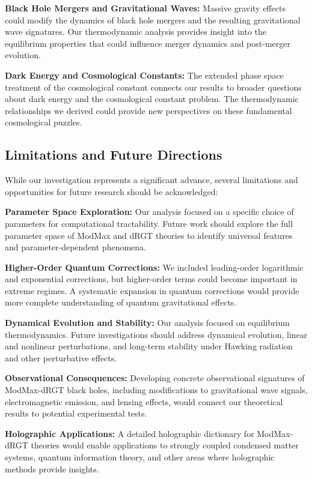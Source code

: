 \documentclass[12pt]{article}
\begin{document}
\textbf{Black Hole Mergers and Gravitational Waves:} Massive gravity effects could modify the dynamics of black hole mergers and the resulting gravitational wave signatures. Our thermodynamic analysis provides insight into the equilibrium properties that could influence merger dynamics and post-merger evolution.

\textbf{Dark Energy and Cosmological Constants:} The extended phase space treatment of the cosmological constant connects our results to broader questions about dark energy and the cosmological constant problem. The thermodynamic relationships we derived could provide new perspectives on these fundamental cosmological puzzles.

\subsection{Limitations and Future Directions}

While our investigation represents a significant advance, several limitations and opportunities for future research should be acknowledged:

\textbf{Parameter Space Exploration:} Our analysis focused on a specific choice of parameters for computational tractability. Future work should explore the full parameter space of ModMax and dRGT theories to identify universal features and parameter-dependent phenomena.

\textbf{Higher-Order Quantum Corrections:} We included leading-order logarithmic and exponential corrections, but higher-order terms could become important in extreme regimes. A systematic expansion in quantum corrections would provide more complete understanding of quantum gravitational effects.

\textbf{Dynamical Evolution and Stability:} Our analysis focused on equilibrium thermodynamics. Future investigations should address dynamical evolution, linear and nonlinear perturbations, and long-term stability under Hawking radiation and other perturbative effects.

\textbf{Observational Consequences:} Developing concrete observational signatures of ModMax-dRGT black holes, including modifications to gravitational wave signals, electromagnetic emission, and lensing effects, would connect our theoretical results to potential experimental tests.

\textbf{Holographic Applications:} A detailed holographic dictionary for ModMax-dRGT theories would enable applications to strongly coupled condensed matter systems, quantum information theory, and other areas where holographic methods provide insights.
\end{document}
